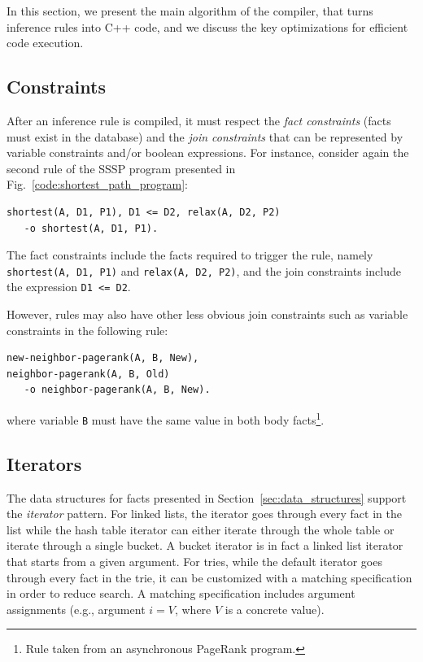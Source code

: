 
In this section, we present the main algorithm of the compiler, that turns
inference rules into C++ code, and we discuss the key optimizations for
efficient code execution.

\subsection{Constraints}

After an inference rule is compiled, it must respect the \emph{fact constraints}
(facts must exist in the database) and the \emph{join constraints} that can be
represented by variable constraints and/or boolean expressions. For instance,
consider again the second rule of the SSSP program presented in
Fig.~\ref{code:shortest_path_program}:

\begin{Verbatim}[fontsize=\scriptsize,label=example_rule]
shortest(A, D1, P1), D1 <= D2, relax(A, D2, P2)
   -o shortest(A, D1, P1).
\end{Verbatim}

The fact constraints include the facts required to trigger the rule, namely
\texttt{shortest(A, D1, P1)} and \texttt{relax(A, D2, P2)}, and the join
constraints include the expression \texttt{D1 <= D2}.

However, rules may also have other less obvious join constraints such as
variable constraints in the following rule:

\begin{Verbatim}[fontsize=\scriptsize]
new-neighbor-pagerank(A, B, New),
neighbor-pagerank(A, B, Old)
   -o neighbor-pagerank(A, B, New).
\end{Verbatim}

\noindent where variable \texttt{B} must have the same value in both body
facts\footnote{Rule taken from an asynchronous PageRank program.}.

\subsection{Iterators}

The data structures for facts presented in Section~\ref{sec:data_structures}
support the \emph{iterator} pattern. For linked lists, the iterator goes
through every fact in the list while the hash table iterator can either iterate
through the whole table or iterate through a single bucket. A bucket iterator is
in fact a linked list iterator that starts from a given argument.
For tries, while the default iterator goes through every fact in
the trie, it can be customized with a matching specification in
order to reduce search. A matching specification includes argument
assignments (e.g., argument $i = V$, where $V$ is a concrete value).

